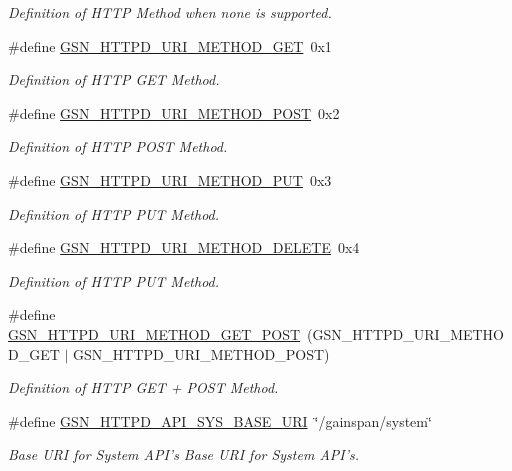 \begin{DoxyCompactItemize}
\begin{DoxyCompactList}\small\item\em Definition of HTTP Method when none is supported. \end{DoxyCompactList}\item 
\#define \hyperlink{a00666_gacd507c9947ef6c72439a7a6b334ba992}{GSN\_\-HTTPD\_\-URI\_\-METHOD\_\-GET}~0x1
\begin{DoxyCompactList}\small\item\em Definition of HTTP GET Method. \end{DoxyCompactList}\item 
\#define \hyperlink{a00666_gafcfe6d0dabbefac822f05864c5b15aa6}{GSN\_\-HTTPD\_\-URI\_\-METHOD\_\-POST}~0x2
\begin{DoxyCompactList}\small\item\em Definition of HTTP POST Method. \end{DoxyCompactList}\item 
\#define \hyperlink{a00666_ga770c378292f790cfba51990b41cf58dc}{GSN\_\-HTTPD\_\-URI\_\-METHOD\_\-PUT}~0x3
\begin{DoxyCompactList}\small\item\em Definition of HTTP PUT Method. \end{DoxyCompactList}\item 
\#define \hyperlink{a00666_ga2c713aa7f2f3beef019826bca59fae7a}{GSN\_\-HTTPD\_\-URI\_\-METHOD\_\-DELETE}~0x4
\begin{DoxyCompactList}\small\item\em Definition of HTTP PUT Method. \end{DoxyCompactList}\item 
\#define \hyperlink{a00666_ga02224e5a5226487aecd6d50f7812ed07}{GSN\_\-HTTPD\_\-URI\_\-METHOD\_\-GET\_\-POST}~(GSN\_\-HTTPD\_\-URI\_\-METHOD\_\-GET $|$ GSN\_\-HTTPD\_\-URI\_\-METHOD\_\-POST)
\begin{DoxyCompactList}\small\item\em Definition of HTTP GET + POST Method. \end{DoxyCompactList}\item 
\#define \hyperlink{a00666_gad35e4cccb1b941e871e8679071c231ff}{GSN\_\-HTTPD\_\-API\_\-SYS\_\-BASE\_\-URI}~\char`\"{}/gainspan/system\char`\"{}
\begin{DoxyCompactList}\small\item\em Base URI for System API's Base URI for System API's. \end{DoxyCompactList}\item 

\end{DoxyCompactItemize}
